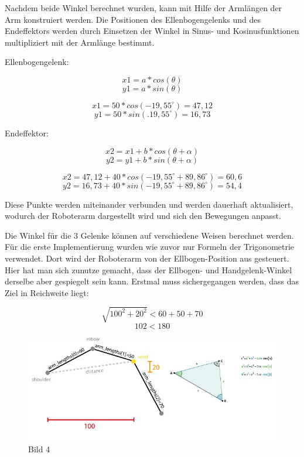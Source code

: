\documentclass[12pt]{article}
\begin{document}
    

    Nachdem beide Winkel berechnet wurden, kann mit Hilfe der Armlängen der Arm konstruiert werden.
    Die Positionen des Ellenbogengelenks und des Endeffektors werden durch Einsetzen der Winkel in
    Sinus- und Kosinusfunktionen multipliziert mit der Armlänge bestimmt.

    Ellenbogengelenk:

    \[
        x1 = a * cos(\theta)
    \]
    \[
        y1 = a * sin(\theta)
    \]

    \[
        x1 = 50 * cos(-19,55^\circ) = 47,12
    \]
    \[
        y1 = 50 * sin(.19,55^\circ) = 16,73
    \]

    Endeffektor:

    \[
        x2 = x1 + b * cos(\theta + \alpha)
    \]
    \[
        y2 = y1 + b * sin(\theta + \alpha)
    \]

    \[
        x2 = 47,12 + 40 * cos(-19,55^\circ + 89,86^\circ) = 60,6
    \]
    \[
        y2 = 16,73 + 40 * sin(-19,55^\circ + 89,86^\circ) = 54,4
    \]

    Diese Punkte werden miteinander verbunden und werden dauerhaft aktualisiert, wodurch der
    Roboterarm dargestellt wird und sich den Bewegungen anpasst.

    

    Die Winkel für die 3 Gelenke können auf verschiedene Weisen berechnet werden. Für die erste
    Implementierung wurden wie zuvor nur Formeln der Trigonometrie verwendet. Dort wird der
    Roboterarm von der Ellbogen-Position aus gesteuert. Hier hat man sich zunutze gemacht, dass
    der Ellbogen- und Handgelenk-Winkel derselbe aber gespiegelt sein kann.
    Erstmal muss sichergegangen werden, dass das Ziel in Reichweite liegt:

    \[
        \sqrt{100^2 + 20^2} < 60 + 50 +70
    \]
    \[
        102 < 180
    \]

    

    \begin{figure}[h]
        \centering
        \includegraphics[width = \linewidth]{Bild 4}
        \caption{Bild 4}
    \end{figure}
\end{document}
